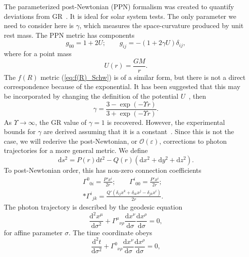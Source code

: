 \documentclass[aps,prd,amsfonts,amssymb,amsmath,nofootinbib,reprint,showpacs]{revtex4-1}
\newcommand{\eqnref}[1]{(\ref{eq:#1})}
\newcommand{\dd}{\ensuremath{\text{d}}}
\newcommand{\diff}[2]{\ensuremath{\frac{\dd {#1}}{\dd {#2}}}}
\newcommand{\difftwo}[2]{\ensuremath{\frac{\dd^2 {#1}}{\dd {#2}^2}}}
\newcommand{\order}[1]{\ensuremath{\mathcal{O}({#1})}}
\begin{document}
The parameterized post-Newtonian (PPN) formalism was created to quantify deviations from GR~\cite{Will1993, Will2006}. It is ideal for solar system tests. The only parameter we need to consider here is $\gamma$, which measures the space-curvature produced by unit rest mass. The PPN metric has components
\begin{equation}
g_{00} = 1 + 2U; \qquad g_{ij} = -(1 + 2\gamma U)\delta_{ij},
\end{equation}
where for a point mass
\begin{equation}
U(r) = \frac{GM}{r}.
\end{equation}
The $f(R)$ metric \eqnref{f(R)_Schw} is of a similar form, but there is not a direct correspondence because of the exponential. It has been suggested that this may be incorporated by changing the definition of the potential $U$~\cite{Olmo2007c, DeFelice2010}, then
\begin{equation}
\gamma = \frac{3 - \exp(-\Upsilon r)}{3 + \exp(-\Upsilon r)}.
\end{equation}
As $\Upsilon \rightarrow \infty$, the GR value of $\gamma = 1$ is recovered. However, the experimental bounds for $\gamma$ are derived assuming that it is a constant~\cite{Will1993}. Since this is not the case, we will rederive the post-Newtonian, or $\order{\varepsilon}$, corrections to photon trajectories for a more general metric. We define
\begin{equation}
\dd s^2 = P(r)\dd t^2 - Q(r)\left(\dd x^2 + \dd y^2 + \dd z^2\right).
\end{equation}
To post-Newtonian order, this has non-zero connection coefficients
\begin{equation}
\begin{split}
{\Gamma^0}_{0i} = \frac{P'x^i}{2r}; \qquad {\Gamma^i}_{00} = \frac{P'x^i}{2r}; \quad\\*
{\Gamma^i}_{jk} = \frac{Q'(\delta_{ij}x^k + \delta_{ik}x^j-\delta_{jk}x^i)}{2r}.
\end{split}
\end{equation}
The photon trajectory is described by the geodesic equation
\begin{equation}
\difftwo{x^\mu}{\sigma} + {\Gamma^\mu}_{\nu\rho}\diff{x^\nu}{\sigma}\diff{x^\rho}{\sigma} = 0,
\label{eq:Geodesic}
\end{equation}
for affine parameter $\sigma$. The time coordinate obeys
\begin{equation}
\difftwo{t}{\sigma} + {\Gamma^0}_{\nu\rho}\diff{x^\nu}{\sigma}\diff{x^\rho}{\sigma} = 0,
\end{equation}
\end{document}
